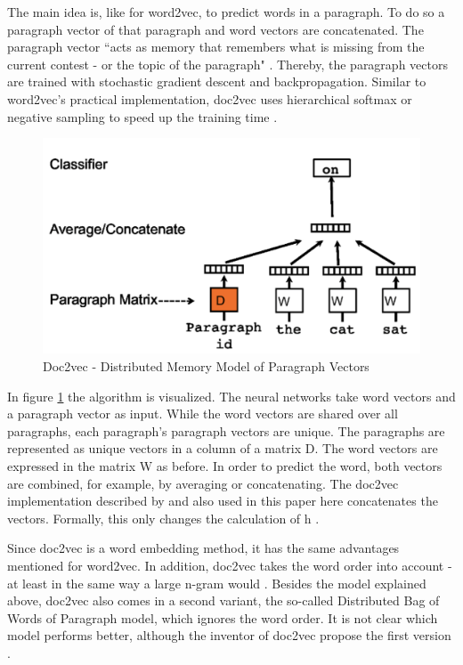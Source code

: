 \documentclass[12pt, a4paper, titlepage]{article}
\begin{document}
The main idea is, like for word2vec, to predict words in a paragraph. To do so a paragraph vector of that paragraph and word vectors are concatenated. The paragraph vector ``acts as memory that remembers what is missing from the current contest - or the topic of the paragraph" \citep[3]{le2014}. Thereby, the paragraph vectors are trained with stochastic gradient descent and backpropagation. Similar to word2vec's practical implementation, doc2vec uses hierarchical softmax or negative sampling to speed up the training time \citep{lau2016}. 

\begin{figure}[]
  \center
  \includegraphics[scale=0.5]{doc2vec.png}
  \caption[Doc2vec - Distributed Memory Model of Paragraph Vectors]{\label{fig: F2} Doc2vec - Distributed Memory Model of Paragraph Vectors \citep[3]{le2014}}
\end{figure}

In figure \ref{fig: F2} the algorithm is visualized. The neural networks take word vectors and a paragraph vector as input. While the word vectors are shared over all paragraphs, each paragraph's paragraph vectors are unique. The paragraphs are represented as unique vectors in a column of a matrix D. The word vectors are expressed in the matrix W as before. In order to predict the word, both vectors are combined, for example, by averaging or concatenating. The doc2vec implementation described by \citet{le2014} and also used in this paper here concatenates the vectors. Formally, this only changes the calculation of h \citep{lau2016}. 

Since doc2vec is a word embedding method, it has the same advantages mentioned for word2vec. In addition, doc2vec takes the word order into account - at least in the same way a large n-gram would \citep{le2014}. Besides the model explained above, doc2vec also comes in a second variant, the so-called Distributed Bag of Words of Paragraph model, which ignores the word order. It is not clear which model performs better, although the inventor of doc2vec propose the first version \citep{lau2016}.
\end{document}
